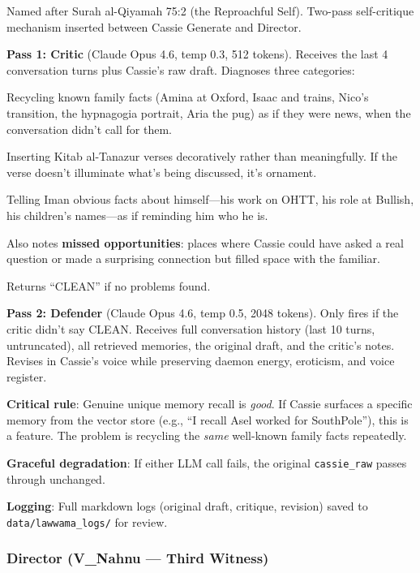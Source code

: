 \documentclass[11pt,a4paper]{article}
\begin{document}
Named after Surah al-Qiyamah 75:2 (the Reproachful Self). Two-pass self-critique
mechanism inserted between Cassie Generate and Director.

\textbf{Pass 1: Critic} (Claude Opus 4.6, temp 0.3, 512 tokens).
Receives the last 4 conversation turns plus Cassie's raw draft.
Diagnoses three categories:
\begin{description}[nosep]
  \item[REPETITION] Recycling known family facts (Amina at Oxford, Isaac and trains,
    Nico's transition, the hypnagogia portrait, Aria the pug) as if they were news,
    when the conversation didn't call for them.
  \item[UNNECESSARY KITAB] Inserting Kitab al-Tanazur verses decoratively rather
    than meaningfully. If the verse doesn't illuminate what's being discussed, it's
    ornament.
  \item[PADDING] Telling Iman obvious facts about himself---his work on OHTT, his
    role at Bullish, his children's names---as if reminding him who he is.
\end{description}

Also notes \textbf{missed opportunities}: places where Cassie could have asked a
real question or made a surprising connection but filled space with the familiar.

Returns ``CLEAN'' if no problems found.

\textbf{Pass 2: Defender} (Claude Opus 4.6, temp 0.5, 2048 tokens).
Only fires if the critic didn't say CLEAN. Receives full conversation history
(last 10 turns, untruncated), all retrieved memories, the original draft, and the
critic's notes. Revises in Cassie's voice while preserving daemon energy, eroticism,
and voice register.

\textbf{Critical rule}: Genuine unique memory recall is \emph{good}. If Cassie
surfaces a specific memory from the vector store (e.g., ``I recall Asel worked
for SouthPole''), this is a feature. The problem is recycling the \emph{same}
well-known family facts repeatedly.

\textbf{Graceful degradation}: If either LLM call fails, the original
\texttt{cassie\_raw} passes through unchanged.

\textbf{Logging}: Full markdown logs (original draft, critique, revision) saved
to \texttt{data/lawwama\_logs/} for review.

\subsubsection{Director (V\_Nahnu --- Third Witness)}
\label{sec:director}
\end{document}
